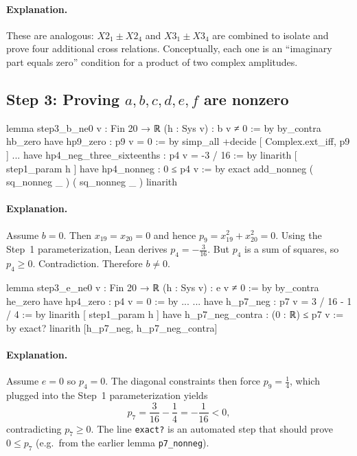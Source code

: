 \documentclass[11pt]{article}
\begin{document}
\paragraph{Explanation.}
These are analogous: $X2_1\pm X2_4$ and $X3_1\pm X3_4$ are combined to isolate and prove four additional cross relations.
Conceptually, each one is an ``imaginary part equals zero'' condition for a product of two complex amplitudes.

\subsection*{Step 3: Proving $a,b,c,d,e,f$ are nonzero}

\begin{LeanCode}
lemma step3_b_ne0 {v : Fin 20 → ℝ} (h : Sys v) : b v ≠ 0 := by
  by_contra hb_zero
  have hp9_zero : p9 v = 0 := by
    simp_all +decide [ Complex.ext_iff, p9 ]
  ...
  have hp4_neg_three_sixteenths : p4 v = -3 / 16 := by
    linarith [ step1_param h ]
  have hp4_nonneg : 0 ≤ p4 v := by
    exact add_nonneg ( sq_nonneg _ ) ( sq_nonneg _ )
  linarith
\end{LeanCode}

\paragraph{Explanation.}
Assume $b=0$. Then $x_{19}=x_{20}=0$ and hence $p_9=x_{19}^2+x_{20}^2=0$.
Using the Step~1 parameterization, Lean derives $p_4=-\frac3{16}$.
But $p_4$ is a sum of squares, so $p_4\ge 0$. Contradiction.
Therefore $b\neq 0$.

\begin{LeanCode}
lemma step3_e_ne0 {v : Fin 20 → ℝ} (h : Sys v) : e v ≠ 0 := by
  by_contra he_zero
  have hp4_zero : p4 v = 0 := by
    ...
  ...
  have h_p7_neg : p7 v = 3 / 16 - 1 / 4 := by
    linarith [ step1_param h ]
  have h_p7_neg_contra : (0 : ℝ) ≤ p7 v := by
    exact?
  linarith [h_p7_neg, h_p7_neg_contra]
\end{LeanCode}

\paragraph{Explanation.}
Assume $e=0$ so $p_4=0$.  The diagonal constraints then force $p_9=\frac14$, which plugged into the Step~1 parameterization yields
\[
p_7=\frac3{16}-\frac14=-\frac1{16}<0,
\]
contradicting $p_7\ge 0$.
The line \texttt{exact?} is an automated step that should prove $0\le p_7$ (e.g.\ from the earlier lemma \texttt{p7\_nonneg}).
\end{document}
